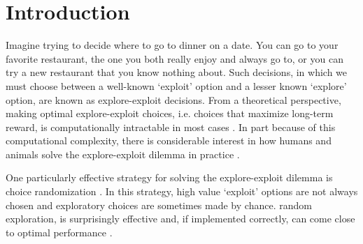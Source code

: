 \documentclass[12pt]{article}
\begin{document}
\begin{abstract}
\end{abstract}
	\newpage
	\section*{Introduction}
	
	

	Imagine trying to decide where to go to dinner on a date. You can go to your favorite restaurant, the one you both really enjoy and always go to, or you can try a new restaurant that you know nothing about. Such decisions, in which we must choose between a well-known `exploit' option and a lesser known `explore' option, are known as explore-exploit decisions.  From a theoretical perspective, making optimal explore-exploit choices, i.e. choices that maximize long-term reward, is computationally intractable in most cases \citep{eegittins74, eeBasu18}. In part because of this computational complexity, there is considerable interest in how humans and animals solve the explore-exploit dilemma in practice .
	
	One particularly effective strategy for solving the explore-exploit dilemma is choice randomization \citep{eethompson33, eewatkins89, eebridle90} . In this strategy, high value `exploit' options are not always chosen and exploratory choices are sometimes made by chance.   random exploration, is surprisingly effective and, if implemented correctly, can come close to optimal performance \citep{eethompson33, eebridle90, eeAgrawal11, eeChapelle11}.
	
\end{document}

